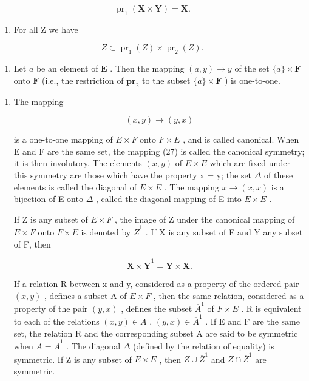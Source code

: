 \[
\operatorname{pr} _ {1} (\mathbf {X} \times \mathbf {Y}) = \mathbf {X}.\tag{25}
\]

\begin{enumerate}
\def\labelenumi{(\alph{enumi})}
\setcounter{enumi}{6}
\tightlist
\item
  For all Z we have
\end{enumerate}

\[
Z \subset \operatorname{pr} _ {1} (Z) \times \operatorname{pr} _ {2} (Z).\tag{26}
\]

\begin{enumerate}
\def\labelenumi{(\alph{enumi})}
\setcounter{enumi}{7}
\tightlist
\item
  Let \(a\) be an element of \(\mathbf{E}\) . Then the mapping \((a, y) \to y\) of the set \(\{a\} \times \mathbf{F}\) onto \(\mathbf{F}\) (i.e., the restriction of \(\mathbf{pr}_2\) to the subset \(\{a\} \times \mathbf{F}\) ) is one-to-one.
\end{enumerate}

\begin{enumerate}
\def\labelenumi{\arabic{enumi}.}
\setcounter{enumi}{3}
\item
  The mapping

\[
(x, y) \rightarrow (y, x)\tag{27}
\]

is a one-to-one mapping of \(E \times F\) onto \(F \times E\) , and is called canonical. When E and F are the same set, the mapping (27) is called the canonical symmetry; it is then involutory. The elements \((x, y)\) of \(E \times E\) which are fixed under this symmetry are those which have the property x = y; the set \(\Delta\) of these elements is called the diagonal of \(E \times E\) . The mapping \(x \to (x, x)\) is a bijection of E onto \(\Delta\) , called the diagonal mapping of E into \(E \times E\) .

If Z is any subset of \(E \times F\) , the image of Z under the canonical mapping of \(E \times F\) onto \(F \times E\) is denoted by \(\overline{Z}^{1}\) . If X is any subset of E and Y any subset of F, then

\[
\overline{\mathbf {X} \times \mathbf {Y}}^{1} = \mathbf {Y} \times \mathbf {X}.
\]

If a relation R between x and y, considered as a property of the ordered pair \((x, y)\) , defines a subset A of \(E \times F\) , then the same relation, considered as a property of the pair \((y, x)\) , defines the subset \(\overline{A}^{1}\) of \(F \times E\) . R is equivalent to each of the relations \((x, y) \in A\) , \((y, x) \in \overline{A}^{1}\) . If E and F are the same set, the relation R and the corresponding subset A are said to be symmetric when \(A = \overline{A}^{1}\) . The diagonal \(\Delta\) (defined by the relation of equality) is symmetric. If Z is any subset of \(E \times E\) , then \(Z \cup \overline{Z}^{1}\) and \(Z \cap \overline{Z}^{1}\) are symmetric.

\end{enumerate}


